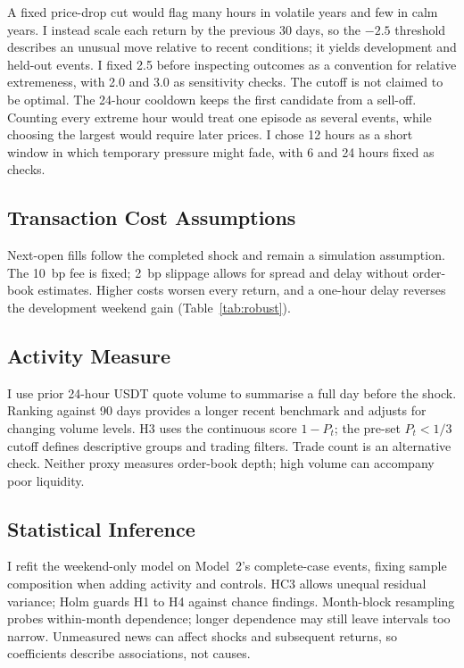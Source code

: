 \documentclass[11pt,a4paper]{article}
\begin{document}
A fixed price-drop cut would flag many hours in volatile years and few in calm years. I instead scale each return by the previous 30 days, so the $-2.5$ threshold describes an unusual move relative to recent conditions; it yields \DevEvents{} development and \HoEvents{} held-out events. I fixed 2.5 before inspecting outcomes as a convention for relative extremeness, with 2.0 and 3.0 as sensitivity checks. The cutoff is not claimed to be optimal. The 24-hour cooldown keeps the first candidate from a sell-off. Counting every extreme hour would treat one episode as several events, while choosing the largest would require later prices. I chose 12 hours as a short window in which temporary pressure might fade, with 6 and 24 hours fixed as checks.

\subsection{Transaction Cost Assumptions}

Next-open fills follow the completed shock and remain a simulation assumption. The 10~bp fee is fixed; 2~bp slippage allows for spread and delay without order-book estimates. Higher costs worsen every return, and a one-hour delay reverses the development weekend gain (Table~\ref{tab:robust}).

\subsection{Activity Measure}

I use prior 24-hour USDT quote volume to summarise a full day before the shock. Ranking against 90 days provides a longer recent benchmark and adjusts for changing volume levels. H3 uses the continuous score $1-P_t$; the pre-set $P_t<1/3$ cutoff defines descriptive groups and trading filters. Trade count is an alternative check. Neither proxy measures order-book depth; high volume can accompany poor liquidity.

\subsection{Statistical Inference}

I refit the weekend-only model on Model~2's complete-case events, fixing sample composition when adding activity and controls. HC3 allows unequal residual variance; Holm guards H1 to H4 against chance findings. Month-block resampling probes within-month dependence; longer dependence may still leave intervals too narrow. Unmeasured news can affect shocks and subsequent returns, so coefficients describe associations, not causes.
\end{document}
